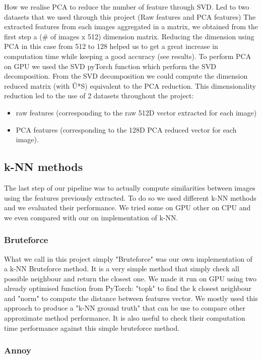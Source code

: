 \documentclass[a4paper]{article}
\begin{document}
How we realise PCA to reduce the number of feature through SVD.
Led to two datasets that we used through this project (Raw features and PCA features)
The extracted features from each images aggregated in a matrix, we obtained from the first step a (\# of images x 512) dimension matrix. Reducing the dimension using PCA in this case from 512 to 128 helped us to get a great increase in computation time while keeping a good accuracy (see results). To perform PCA on GPU we used the SVD pyTorch function which perform the SVD decomposition. From the SVD decomposition we could compute the dimension reduced matrix (with Û*S) equivalent to the PCA reduction. This dimensionality reduction led to the use of 2 datasets throughout the project:
\begin{itemize}
	\item raw features (corresponding to the raw 512D vector extracted for each image)
	\item PCA features (corresponding to the 128D PCA reduced vector for each image).
\end{itemize}

\subsection{k-NN methods}

The last step of our pipeline was to actually compute similarities between images using the features previously extracted. To do so we used different k-NN methods and we evaluated their performance. We tried some on GPU other on CPU and we even compared with our on implementation of k-NN.

\subsubsection{Bruteforce}

What we call in this project simply "Bruteforce" was our own implementation of a k-NN Bruteforce method. It is a very simple method that simply check all possible neighbour and return the closest one. We made it run on GPU using two already optimised function from PyTorch: "topk" to find the k closest neighbour and "norm" to compute the distance between features vector. We mostly used this approach to produce a "k-NN ground truth" that can be use to compare other approximate method performance. It is also useful to check their computation time performance against this simple bruteforce method.

\subsubsection{Annoy}
\end{document}
